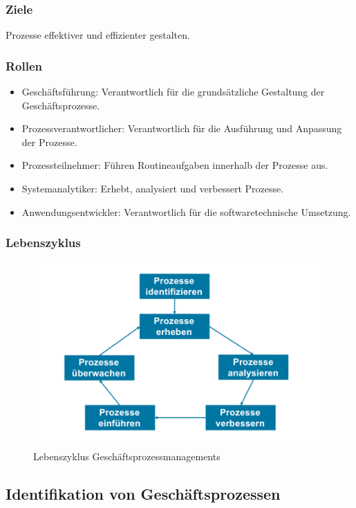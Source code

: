     \subsubsection*{Ziele}
        Prozesse effektiver und effizienter gestalten.
    \subsubsection*{Rollen}
        \begin{itemize}
            \item Geschäftsführung: Verantwortlich für die grundsätzliche Gestaltung der Geschäftsprozesse.
            \item Prozessverantwortlicher: Verantwortlich für die Ausführung und Anpassung der Prozesse.
            \item Prozessteilnehmer: Führen Routineaufgaben innerhalb der Prozesse aus.
            \item Systemanalytiker: Erhebt, analysiert und verbessert Prozesse.
            \item Anwendungsentwickler: Verantwortlich für die softwaretechnische Umsetzung.
        \end{itemize}
    \subsubsection*{Lebenszyklus}
        \begin{figure}[h]
            \centering
            \includegraphics[width=\textwidth]{image/Lebenszyklus.png}
            \caption{Lebenszyklus Geschäftsprozessmanagements}
            \label{fig:Lebenszyklus}
        \end{figure}

\subsection{Identifikation von Geschäftsprozessen}
